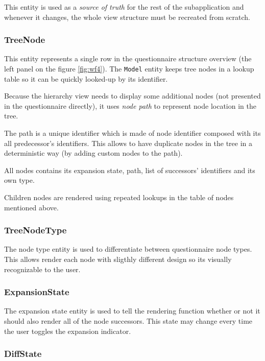 This entity is used as a \textit{source of truth} for the rest of the subapplication and whenever it changes, the whole view structure must be recreated from scratch.

\subsubsection*{TreeNode}

This entity represents a single row in the questionnaire structure overview (the left panel on the figure \ref{fig:wf4}).
The \texttt{Model} entity keeps tree nodes in a lookup table so it can be quickly looked-up by its identifier.

Because the hierarchy view needs to display some additional nodes (not presented in the questionnaire directly), it uses \textit{node path} to represent node location in the tree.

The path is a unique identifier which is made of node identifier composed with its all predecessor's identifiers.
This allows to have duplicate nodes in the tree in a deterministic way (by adding custom nodes to the path).

All nodes contains its expansion state, path, list of successors' identifiers and its own type.

Children nodes are rendered using repeated lookups in the table of nodes mentioned above.

\subsubsection*{TreeNodeType}

The node type entity is used to differentiate between questionnaire node types.
This allows render each node with sligthly different design so its visually recognizable to the user.

\subsubsection*{ExpansionState}

The expansion state entity is used to tell the rendering function whether or not it should also render all of the node successors.
This state may change every time the user toggles the expansion indicator.

\subsubsection*{DiffState}\label{sec:diffstate}

